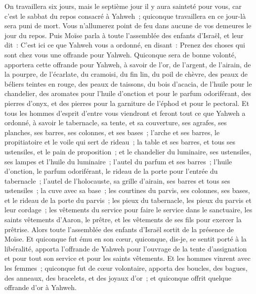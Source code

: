 \begin{multicols}{2}
On travaillera six jours, mais le septième jour il y aura sainteté pour vous, car c'est le sabbat du repos consacré à Yahweh~; quiconque travaillera en ce jour-là sera puni de mort.
Vous n'allumerez point de feu dans aucune de vos demeures le jour du repos.
Puis Moïse parla à toute l'assemblée des enfants d'Israël, et leur dit~: C'est ici ce que Yahweh vous a ordonné, en disant~:
Prenez des choses qui sont chez vous une offrande pour Yahweh. Quiconque sera de bonne volonté, apportera cette offrande pour Yahweh, à savoir de l'or, de l'argent, de l'airain,
de la pourpre, de l'écarlate, du cramoisi, du fin lin, du poil de chèvre,
des peaux de béliers teintes en rouge, des peaux de taissons, du bois d'acacia,
de l'huile pour le chandelier, des aromates pour l'huile d'onction et pour le parfum odoriférant,
des pierres d'onyx, et des pierres pour la garniture de l'éphod et pour le pectoral.
Et tous les hommes d'esprit d'entre vous viendront et feront tout ce que Yahweh a ordonné,
à savoir le tabernacle, sa tente, et sa couverture, ses agrafes, ses planches, ses barres, ses colonnes, et ses bases~;
l'arche et ses barres, le propitiatoire et le voile qui sert de rideau~;
la table et ses barres, et tous ses ustensiles, et le pain de proposition~;
et le chandelier du luminaire, ses ustensiles, ses lampes et l'huile du luminaire~;
l'autel du parfum et ses barres~; l'huile d'onction, le parfum odoriférant, le rideau de la porte pour l'entrée du tabernacle~;
l'autel de l'holocauste, sa grille d'airain, ses barres et tous ses ustensiles~; la cuve avec sa base~;
les courtines du parvis, ses colonnes, ses bases, et le rideau de la porte du parvis~;
les pieux du tabernacle, les pieux du parvis et leur cordage~;
les vêtements du service pour faire le service dans le sanctuaire, les saints vêtements d'Aaron, le prêtre, et les vêtements de ses fils pour exercer la prêtrise.
Alors toute l'assemblée des enfants d'Israël sortit de la présence de Moïse.
Et quiconque fut ému en son cœur, quiconque, dis-je, se sentit porté à la libéralité, apporta l'offrande de Yahweh pour l'ouvrage de la tente d'assignation et pour tout son service et pour les saints vêtements.
Et les hommes vinrent avec les femmes~; quiconque fut de cœur volontaire, apporta des boucles, des bagues, des anneaux, des bracelets, et des joyaux d'or~; et quiconque offrit quelque offrande d'or à Yahweh.

\end{multicols}
